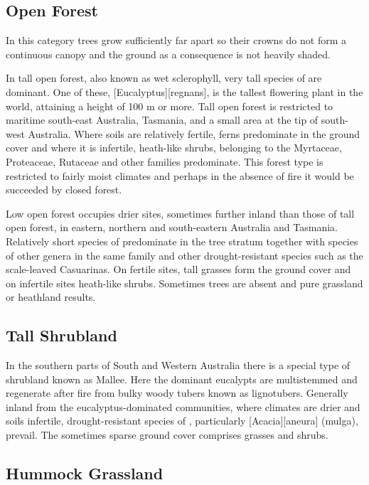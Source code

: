 \subsection{Open Forest}

In this category trees grow sufficiently far apart so their crowns do not form a continuous canopy and the ground as a consequence is not heavily shaded.

In tall open forest, also known as wet sclerophyll, very tall species of  are dominant.
One of these, [Eucalyptus][regnans], is the tallest flowering plant in the world, attaining a height of 100 m or more.
Tall open forest is restricted to maritime south-east Australia, Tasmania, and a small area at the tip of south-west Australia.
Where soils are relatively fertile, ferns predominate in the ground cover and where it is infertile, heath-like shrubs, belonging to the Myrtaceae, Proteaceae, Rutaceae and other families predominate.
This forest type is restricted to fairly moist climates and perhaps in the absence of fire it would be succeeded by closed forest.

Low open forest occupies drier sites, sometimes further inland than those of tall open forest, in eastern, northern and south-eastern Australia and Tasmania.
Relatively short species of  predominate in the tree stratum together with species of other genera in the same family and other drought-resistant species such as the scale-leaved Casuarinas.
On fertile sites, tall grasses form the ground cover and on infertile sites heath-like shrubs.
Sometimes trees are absent and pure grassland or heathland results.

\subsection{Tall Shrubland}

In the southern parts of South and Western Australia there is a special type of shrubland known as Mallee.
Here the dominant eucalypts are multistemmed and regenerate after fire from bulky woody tubers known as lignotubers.
Generally inland from the eucalyptus-dominated communities, where climates are drier and soils infertile, drought-resistant species of , particularly [Acacia][aneura] (mulga), prevail.
The sometimes sparse ground cover comprises grasses and shrubs.

\subsection{Hummock Grassland}

